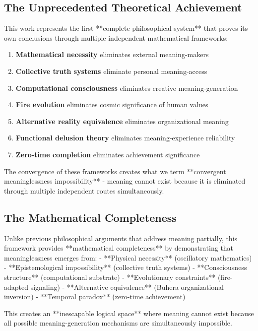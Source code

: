 \documentclass[12pt,a4paper]{article}
\begin{document}
\subsection{The Unprecedented Theoretical Achievement}

This work represents the first **complete philosophical system** that proves its own conclusions through multiple independent mathematical frameworks:

\begin{enumerate}
\item \textbf{Mathematical necessity} eliminates external meaning-makers
\item \textbf{Collective truth systems} eliminate personal meaning-access  
\item \textbf{Computational consciousness} eliminates creative meaning-generation
\item \textbf{Fire evolution} eliminates cosmic significance of human values
\item \textbf{Alternative reality equivalence} eliminates organizational meaning
\item \textbf{Functional delusion theory} eliminates meaning-experience reliability
\item \textbf{Zero-time completion} eliminates achievement significance
\end{enumerate}

The convergence of these frameworks creates what we term **convergent meaninglessness impossibility** - meaning cannot exist because it is eliminated through multiple independent routes simultaneously.

\subsection{The Mathematical Completeness}

Unlike previous philosophical arguments that address meaning partially, this framework provides **mathematical completeness** by demonstrating that meaninglessness emerges from:
- **Physical necessity** (oscillatory mathematics)
- **Epistemological impossibility** (collective truth systems)  
- **Consciousness structure** (computational substrate)
- **Evolutionary constraints** (fire-adapted signaling)
- **Alternative equivalence** (Buhera organizational inversion)
- **Temporal paradox** (zero-time achievement)

This creates an **inescapable logical space** where meaning cannot exist because all possible meaning-generation mechanisms are simultaneously impossible.
\end{document}
